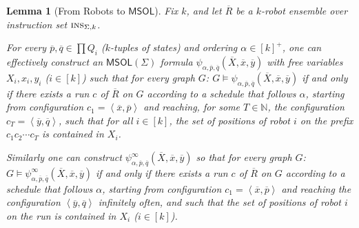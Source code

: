 \documentclass{llncs}
\newtheorem{lemma}{Lemma}
\def\nat{\mathbb{N}}
\newcommand{\tup}[1]{\overline{#1}}
\newcommand{\tpl}[1]{\left<{#1}\right>}
\def\ins{\textsc{ins}}
\def\msol{\mathsf{MSOL}}
\begin{document}
\begin{lemma}[From Robots to $\msol$] \label{lem:msodefinable}
Fix $k$, and let $\tup{R}$ be a $k$-robot ensemble over instruction set $\ins_{\Sigma,k}$.


For every $\tup{p}, \tup{q} \in \prod Q_i$ ($k$-tuples of states) and ordering $\alpha \in [k]^+$,
one can effectively construct an $\msol(\Sigma)$ formula $\psi_{\alpha,\tup{p},\tup{q}}(\tup{X},\tup{x},\tup{y})$ with free variables $X_i,x_i,y_i$ ($i \in [k]$) such that for every graph $G$: $G \models \psi_{\alpha,\tup{p},\tup{q}}(\tup{X},\tup{x},\tup{y})$ if and only if
 there exists a run $c$ of $\tup{R}$ on $G$ according to a schedule that follows $\alpha$, starting from configuration $c_1 = \tpl{\tup{x},\tup{p}}$ and reaching, for some $T \in \nat$, the configuration $c_T = \tpl{\tup{y},\tup{q}}$, such that for all $i \in [k]$, the set of positions of robot $i$ on the prefix $c_1 c_2 \cdots c_T$ is contained in $X_i$.


Similarly one can construct $\psi^\infty_{\alpha,\tup{p},\tup{q}}(\tup{X},\tup{x},\tup{y})$ so that for every graph $G$: $G \models \psi^\infty_{\alpha,\tup{p},\tup{q}}(\tup{X},\tup{x},\tup{y})$ if and only if there exists a run $c$ of $\tup{R}$ on $G$ according to a schedule that follows $\alpha$, starting from configuration $c_1 = \tpl{\tup{x},\tup{p}}$ and reaching the configuration $\tpl{\tup{y},\tup{q}}$ infinitely often, and such that the set of positions of robot $i$ on the run is contained in $X_i$ ($i \in [k]$).
\end{lemma}
\end{document}

